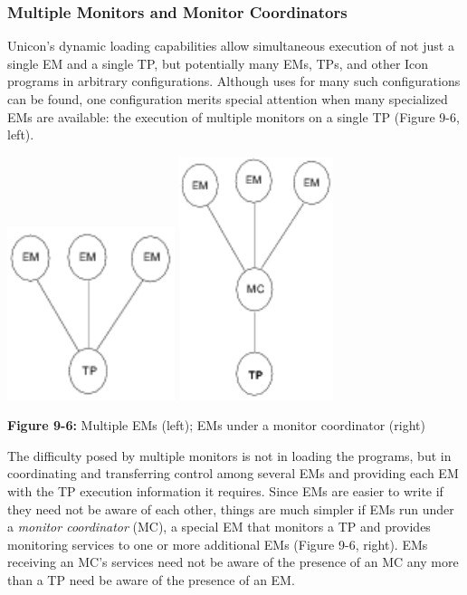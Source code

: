 \subsubsection{Multiple Monitors and Monitor Coordinators}

Unicon's dynamic loading capabilities allow simultaneous execution of
not just a single EM and a single TP, but potentially many EMs, TPs,
and other Icon programs in arbitrary configurations.  Although uses
for many such configurations can be found, one configuration merits
special attention when many specialized EMs are available: the
execution of multiple monitors on a single TP 
(Figure 9-6, left).

\begin{center}
\includegraphics[height=2.0in]{multiems.png}
\hspace{1cm}
\includegraphics[height=2.8in]{mcover.png}
\end{center}

{\sffamily\bfseries Figure 9-6:}
{\sffamily Multiple EMs (left); EMs under a monitor coordinator (right)}

\bigskip

The difficulty posed by multiple monitors is not in loading the
programs, but in coordinating and transferring control among several
EMs and providing each EM with the TP execution information it
requires.  Since EMs are easier to write if they need not be aware of
each other, things are much simpler if EMs run under a
{\em monitor coordinator\/} (MC), a special EM that monitors a TP and
provides monitoring services
to one or more additional EMs (Figure 9-6, right).  EMs receiving an MC's
services need not be aware of the presence of an MC any more than a TP
need be aware of the presence of an EM.

